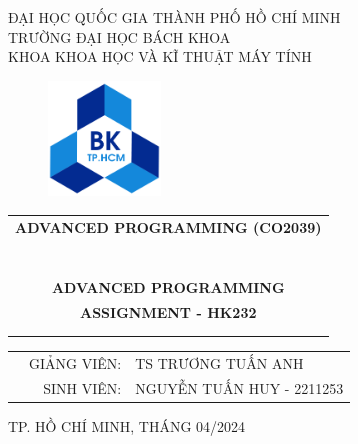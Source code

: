 



\begin{titlepage}
\begin{center}
ĐẠI HỌC QUỐC GIA THÀNH PHỐ HỒ CHÍ MINH \\
TRƯỜNG ĐẠI HỌC BÁCH KHOA \\
KHOA KHOA HỌC VÀ KĨ THUẬT MÁY TÍNH
\end{center}

\vspace{1cm}

\begin{figure}[h!]
\begin{center}
\includegraphics[width=3cm]{Image/hcmut.png}
\end{center}
\end{figure}

\vspace{1cm}


\begin{center}
\begin{tabular}{c}
\multicolumn{1}{l}{\textbf{{\Large ADVANCED PROGRAMMING (CO2039)}}}\\
~~\\
\hline
\\
\\
\textbf{{\Huge ADVANCED PROGRAMMING}}\\
\textbf{{\Huge ASSIGNMENT - HK232}}\\
\\
\\
\hline
\end{tabular}
\end{center}

\vspace{2.5cm}

\begin{table}[h]
\begin{tabular}{rrl}
\hspace{5 cm} & GIẢNG VIÊN: & TS TRƯƠNG TUẤN ANH\\
& SINH VIÊN: & NGUYỄN TUẤN HUY - 2211253 \\
\end{tabular}
\end{table}

\vspace{3cm}

\begin{center}
{\footnotesize TP. HỒ CHÍ MINH, THÁNG 04/2024}
\end{center}
\end{titlepage}


